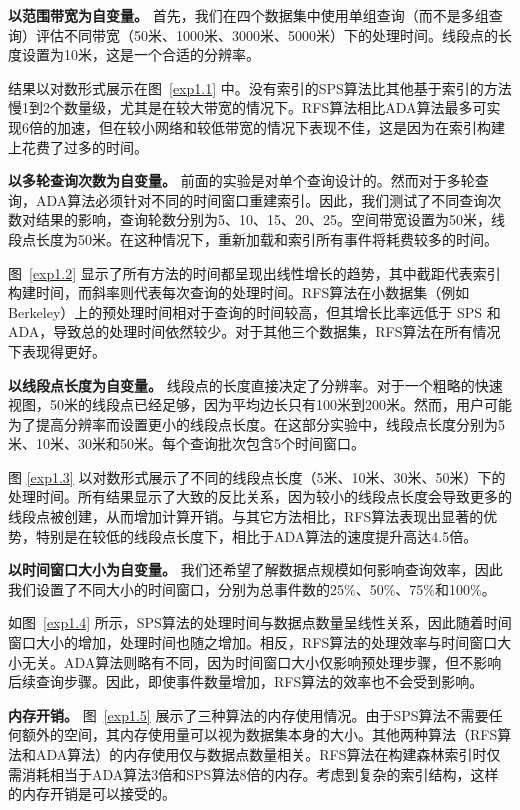 \textbf{以范围带宽为自变量。} 首先，我们在四个数据集中使用单组查询（而不是多组查询）评估不同带宽（50米、1000米、3000米、5000米）下的处理时间。线段点的长度设置为10米，这是一个合适的分辨率。

结果以对数形式展示在图~\ref{exp1.1} 中。没有索引的SPS算法比其他基于索引的方法慢1到2个数量级，尤其是在较大带宽的情况下。RFS算法相比ADA算法最多可实现6倍的加速，但在较小网络和较低带宽的情况下表现不佳，这是因为在索引构建上花费了过多的时间。

\textbf{以多轮查询次数为自变量。} 前面的实验是对单个查询设计的。然而对于多轮查询，ADA算法必须针对不同的时间窗口重建索引。因此，我们测试了不同查询次数对结果的影响，查询轮数分别为5、10、15、20、25。空间带宽设置为50米，线段点长度为50米。在这种情况下，重新加载和索引所有事件将耗费较多的时间。

图~\ref{exp1.2} 显示了所有方法的时间都呈现出线性增长的趋势，其中截距代表索引构建时间，而斜率则代表每次查询的处理时间。RFS算法在小数据集（例如 Berkeley）上的预处理时间相对于查询的时间较高，但其增长比率远低于 SPS 和 ADA，导致总的处理时间依然较少。对于其他三个数据集，RFS算法在所有情况下表现得更好。

\textbf{以线段点长度为自变量。} 线段点的长度直接决定了分辨率。对于一个粗略的快速视图，50米的线段点已经足够，因为平均边长只有100米到200米。然而，用户可能为了提高分辨率而设置更小的线段点长度。在这部分实验中，线段点长度分别为5米、10米、30米和50米。每个查询批次包含5个时间窗口。

图 \ref{exp1.3} 以对数形式展示了不同的线段点长度（5米、10米、30米、50米）下的处理时间。所有结果显示了大致的反比关系，因为较小的线段点长度会导致更多的线段点被创建，从而增加计算开销。与其它方法相比，RFS算法表现出显著的优势，特别是在较低的线段点长度下，相比于ADA算法的速度提升高达4.5倍。 

\textbf{以时间窗口大小为自变量。} 我们还希望了解数据点规模如何影响查询效率，因此我们设置了不同大小的时间窗口，分别为总事件数的25\%、50\%、75\%和100\%。

如图~\ref{exp1.4} 所示，SPS算法的处理时间与数据点数量呈线性关系，因此随着时间窗口大小的增加，处理时间也随之增加。相反，RFS算法的处理效率与时间窗口大小无关。ADA算法则略有不同，因为时间窗口大小仅影响预处理步骤，但不影响后续查询步骤。因此，即使事件数量增加，RFS算法的效率也不会受到影响。

\textbf{内存开销。} 图~\ref{exp1.5} 展示了三种算法的内存使用情况。由于SPS算法不需要任何额外的空间，其内存使用量可以视为数据集本身的大小。其他两种算法（RFS算法和ADA算法）的内存使用仅与数据点数量相关。RFS算法在构建森林索引时仅需消耗相当于ADA算法3倍和SPS算法8倍的内存。考虑到复杂的索引结构，这样的内存开销是可以接受的。

